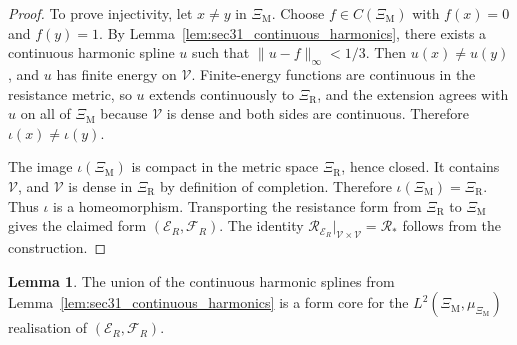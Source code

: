\documentclass{article}
\theoremstyle{plain}
\theoremstyle{definition}
\newtheorem{lemma}[theorem]{Lemma}
\newcommand{\Reff}{\mathscr{R}}
\begin{document}
\begin{proof}
To prove injectivity, let $x\ne y$ in $\Xi_{\mathrm M}$.
Choose $f\in C(\Xi_{\mathrm M})$ with $f(x)=0$ and $f(y)=1$.
By Lemma~\ref{lem:sec31_continuous_harmonics}, there exists a continuous harmonic spline $u$ such that $\|u-f\|_\infty<1/3$.
Then $u(x)\ne u(y)$, and $u$ has finite energy on $\mathscr V$.
Finite-energy functions are continuous in the resistance metric, so $u$ extends continuously to $\Xi_{\mathrm R}$, and the extension agrees with $u$ on all of $\Xi_{\mathrm M}$ because $\mathscr V$ is dense and both sides are continuous.
Therefore $\iota(x)\ne\iota(y)$.

The image $\iota(\Xi_{\mathrm M})$ is compact in the metric space $\Xi_{\mathrm R}$, hence closed.
It contains $\mathscr V$, and $\mathscr V$ is dense in $\Xi_{\mathrm R}$ by definition of completion.
Therefore $\iota(\Xi_{\mathrm M})=\Xi_{\mathrm R}$.
Thus $\iota$ is a homeomorphism.
Transporting the resistance form from $\Xi_{\mathrm R}$ to $\Xi_{\mathrm M}$ gives the claimed form $(\mathcal E_R,\mathcal F_R)$.
The identity $\Reff_{\mathcal E_R}|_{\mathscr V\times\mathscr V}=\Reff_*$ follows from the construction.
\end{proof}

\begin{lemma}\label{lem:sec32_common_core}
The union of the continuous harmonic splines from Lemma~\ref{lem:sec31_continuous_harmonics} is a form core for the $L^2(\Xi_{\mathrm M},\mu_{\Xi_{\mathrm M}})$ realisation of $(\mathcal E_R,\mathcal F_R)$.
\end{lemma}
\end{document}
